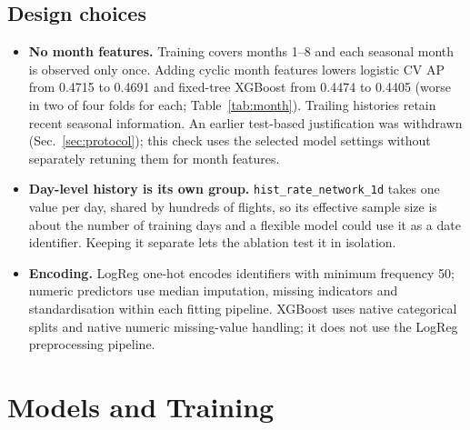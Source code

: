 \documentclass[conference]{IEEEtran}
\begin{document}
\subsection{Design choices}
\begin{itemize}
\item \textbf{No month features.} Training covers months 1--8 and each seasonal month is observed only once. Adding cyclic month features lowers logistic CV AP from 0.4715 to 0.4691 and fixed-tree XGBoost from 0.4474 to 0.4405 (worse in two of four folds for each; Table~\ref{tab:month}). Trailing histories retain recent seasonal information. An earlier test-based justification was withdrawn (Sec.~\ref{sec:protocol}); this check uses the selected model settings without separately retuning them for month features.
\item \textbf{Day-level history is its own group.} \texttt{hist\_rate\_network\_1d} takes one value per day, shared by hundreds of flights, so its effective sample size is about the number of training days and a flexible model could use it as a date identifier. Keeping it separate lets the ablation test it in isolation.
\item \textbf{Encoding.} LogReg one-hot encodes identifiers with minimum frequency 50; numeric predictors use median imputation, missing indicators and standardisation within each fitting pipeline. XGBoost uses native categorical splits and native numeric missing-value handling; it does not use the LogReg preprocessing pipeline.
\end{itemize}

\section{Models and Training}\label{sec:models}
\end{document}
